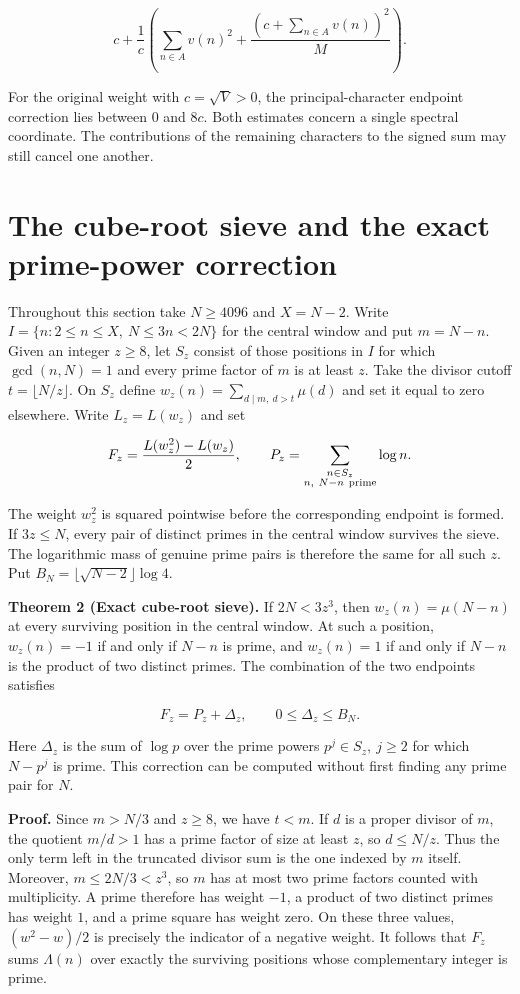 \documentclass[11pt,a4paper]{article}
\begin{document}
\[
c+\frac{1}{c}\left(\sum_{n\in A}v(n)^2+\frac{(c+\sum_{n\in A}v(n))^2}{M}\right).
\]

For the original weight with $c=\sqrt V>0$, the principal-character endpoint correction lies between 0 and $8c$. Both estimates concern a single spectral coordinate. The contributions of the remaining characters to the signed sum may still cancel one another.

\section{The cube-root sieve and the exact prime-power correction}

Throughout this section take $N\ge4096$ and $X=N-2$. Write $I=\{n:2\le n\le X,\ N\le 3n<2N\}$ for the central window and put $m=N-n$. Given an integer $z\ge8$, let $S_z$ consist of those positions in $I$ for which $\gcd(n,N)=1$ and every prime factor of $m$ is at least $z$. Take the divisor cutoff $t=\lfloor N/z\rfloor$. On $S_z$ define $w_z(n)=\sum_{d\mid m,\ d>t}\mu(d)$ and set it equal to zero elsewhere. Write $L_z=L(w_z)$ and set

\[
F_z=\frac{L(w_z^2)-L(w_z)}{2},\qquad P_z=\sum_{\substack{n\in S_z\\ n,\ N-n\ {\rm prime}}}\log n.
\]

The weight $w_z^2$ is squared pointwise before the corresponding endpoint is formed. If $3z\le N$, every pair of distinct primes in the central window survives the sieve. The logarithmic mass of genuine prime pairs is therefore the same for all such $z$. Put $B_N=\lfloor\sqrt{N-2}\rfloor\log4$.

\textbf{Theorem 2 (Exact cube-root sieve).} If $2N<3z^3$, then $w_z(n)=\mu(N-n)$ at every surviving position in the central window. At such a position, $w_z(n)=-1$ if and only if $N-n$ is prime, and $w_z(n)=1$ if and only if $N-n$ is the product of two distinct primes. The combination of the two endpoints satisfies

\[
F_z=P_z+\Delta_z,\qquad 0\le\Delta_z\le B_N.
\]

Here $\Delta_z$ is the sum of $\log p$ over the prime powers $p^j\in S_z,\ j\ge2$ for which $N-p^j$ is prime. This correction can be computed without first finding any prime pair for $N$.

\textbf{Proof.} Since $m>N/3$ and $z\ge8$, we have $t<m$. If $d$ is a proper divisor of $m$, the quotient $m/d>1$ has a prime factor of size at least $z$, so $d\le N/z$. Thus the only term left in the truncated divisor sum is the one indexed by $m$ itself. Moreover, $m\le2N/3<z^3$, so $m$ has at most two prime factors counted with multiplicity. A prime therefore has weight $-1$, a product of two distinct primes has weight $1$, and a prime square has weight zero. On these three values, $(w^2-w)/2$ is precisely the indicator of a negative weight. It follows that $F_z$ sums $\Lambda(n)$ over exactly the surviving positions whose complementary integer is prime.
\end{document}
